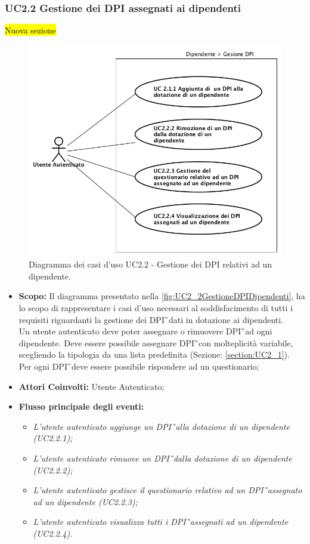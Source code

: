 		\subsubsection{UC2.2 Gestione dei DPI assegnati ai dipendenti}
		\hl{Nuova sezione}
			\label{section:UC2_2}
			\begin{figure}[H]
				\begin{center}
					\includegraphics[width=12cm]{Pics/UC2_2DPIDipendenti.png}
					\caption{
						Diagramma dei casi d'uso UC2.2 - Gestione dei DPI relativi ad un dipendente.}
					\label{fig:UC2_2GestioneDPIDipendenti}
				\end{center}
			\end{figure}
			\begin{itemize}
				\item \textbf{Scopo:} Il diagramma presentato nella \autoref{fig:UC2_2GestioneDPIDipendenti}, ha lo scopo di rappresentare i casi d'uso necessari al soddisfacimento di tutti i requisiti riguardanti la gestione dei \gls{DPI}\G\ dati in dotazione ai dipendenti. \\ Un utente autenticato deve poter assegnare o rimuovere \gls{DPI}\G\ ad ogni dipendente. Deve essere possibile assegnare \gls{DPI}\G\ con molteplicità variabile, scegliendo la tipologia da una lista predefinita (Sezione: \ref{section:UC2_1}).\\
				Per ogni \gls{DPI}\G\ deve essere possibile rispondere ad un questionario;
				\item \textbf{Attori Coinvolti:} Utente Autenticato;
				\item \textbf{Flusso principale degli eventi:} 
				\begin{itemize}
					\item \textit{L'utente autenticato aggiunge un \gls{DPI}\G\ alla dotazione di un dipendente (UC2.2.1);}
					\item \textit{L'utente autenticato rimuove un \gls{DPI}\G\ dalla dotazione di un dipendente  (UC2.2.2);}
					\item \textit{L'utente autenticato gestisce il questionario relativo ad un \gls{DPI}\G\ assegnato ad un dipendente (UC2.2.3);}
					\item \textit{L'utente autenticato visualizza tutti i \gls{DPI}\G\ assegnati ad un dipendente (UC2.2.4).}
				\end{itemize}
			\end{itemize}
